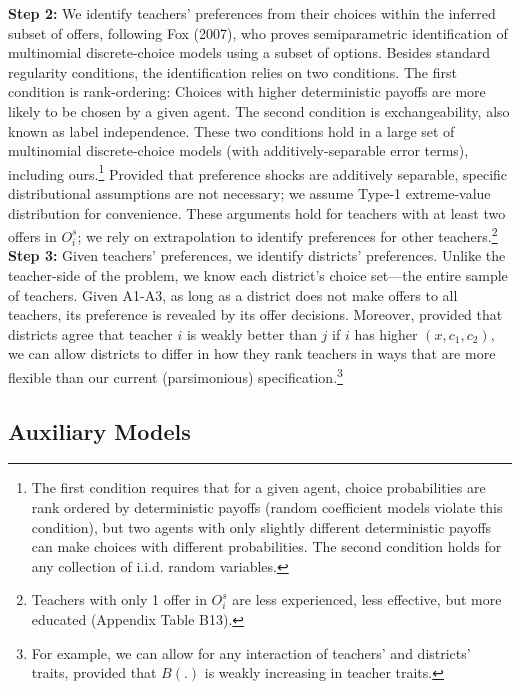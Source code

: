 \documentclass[notitlepage,12pt]{article}%
\begin{document}
\noindent \textbf{Step 2: } We identify teachers'
preferences from their choices within the inferred subset of offers, following  Fox (2007), who proves semiparametric identification of multinomial discrete-choice models using a subset of options. Besides standard
regularity conditions, the identification relies on two conditions. The first
condition is rank-ordering: Choices with higher deterministic payoffs are more
likely to be chosen by a given agent. The second condition is exchangeability,
also known as label independence. These two conditions hold in a large set of
multinomial discrete-choice models (with additively-separable error terms),
including ours.\footnote{The first condition requires that for a given agent,
choice probabilities are rank ordered by deterministic payoffs (random
coefficient models violate this condition), but two agents with only slightly
different deterministic payoffs can make choices with different probabilities.
The second condition holds for any collection of i.i.d. random variables.}
Provided that preference shocks are additively separable, specific
distributional assumptions are not necessary; we assume Type-1 extreme-value
distribution for convenience. These arguments hold for teachers with at least
two offers in $O_{i}^{s}$; we rely on extrapolation to identify preferences
for other teachers.\footnote{Teachers with only 1 offer in $O_{i}^{s}$ are less experienced, less effective, but more educated (Appendix Table B13).}\\

\noindent\textbf{Step 3: } Given teachers' preferences, we identify districts'
preferences. Unlike the teacher-side of the problem, we know each
district's choice set---the entire sample of teachers. Given A1-A3, as long as a district
does not make offers to all teachers, its preference is revealed by its offer decisions. Moreover, provided that districts agree that teacher $i$ is weakly better than $j$ if $i$ has higher $\left(  x,c_{1},c_{2}\right)  ,$ we can allow districts
to differ in how they rank teachers in ways that are more flexible than our
current (parsimonious) specification.\footnote{For example, we can allow for any interaction of teachers' and districts' traits, provided that $B(.)$ is weakly increasing in teacher traits.}

\subsection{Auxiliary Models\label{aux}}
\end{document}
